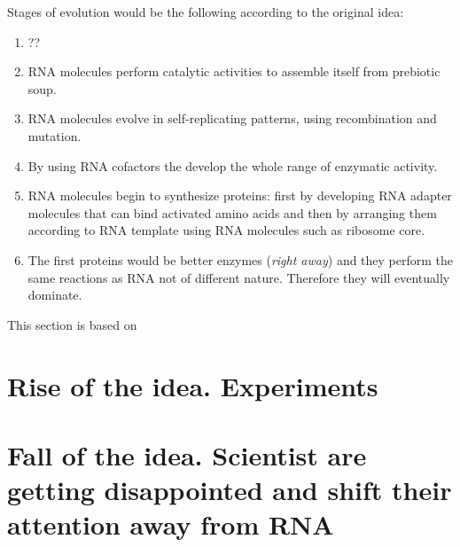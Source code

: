 \documentclass[12pt]{paper}
\begin{document}
Stages of evolution would be the following according to the original idea:
\begin{enumerate}
 \item ??
 \item RNA molecules perform catalytic activities to  assemble itself from prebiotic soup.
 \item RNA molecules evolve in self-replicating patterns, using recombination and mutation.
 \item By using RNA cofactors the develop the whole range of enzymatic activity.
 \item RNA molecules begin to synthesize proteins: first by developing RNA adapter molecules that 
can bind activated amino acids and then by arranging them according to RNA template using RNA 
molecules such as ribosome core.
\item The first proteins would be better enzymes (\textit{right away}) and they perform the same 
reactions as RNA not of different nature. Therefore they will eventually dominate.
\end{enumerate}


This section is based on \cite{Gilbert1986}

\section{Rise of the idea. Experiments}

\section{Fall of the idea. Scientist are getting disappointed and shift their attention away from 
RNA}


  
   
\end{document}
